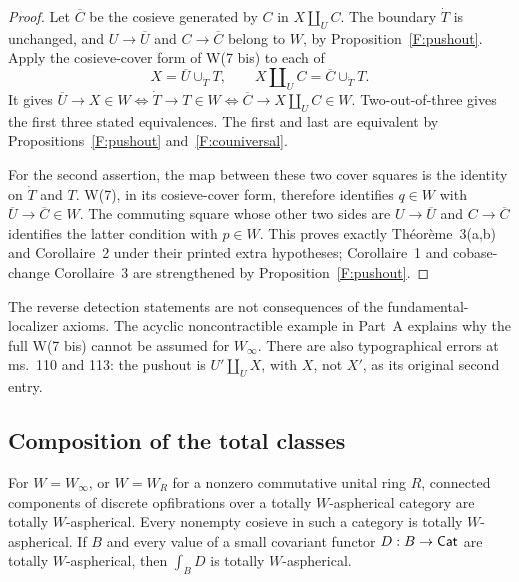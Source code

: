 \begin{proof}
Let $\overline C$ be the cosieve generated by $C$ in
$X\amalg_U C$. The boundary $\dot T$ is unchanged, and
$U\to\overline U$ and $C\to\overline C$ belong to $W$, by
Proposition~\ref{F:pushout}. Apply the cosieve-cover form of
W(7 bis) to each of
\[
 X=\overline U\cup_{\dot T}T,
 \qquad
 X\amalg_U C=\overline C\cup_{\dot T}T.
\]
It gives
$\overline U\to X\in W\Longleftrightarrow
\dot T\to T\in W\Longleftrightarrow
\overline C\to X\amalg_U C\in W$.
Two-out-of-three gives the first three stated equivalences.
The first and last are equivalent by
Propositions~\ref{F:pushout} and~\ref{F:couniversal}.

For the second assertion, the map between these two cover
squares is the identity on $\dot T$ and $T$. W(7), in its
cosieve-cover form, therefore identifies
$q\in W$ with $\overline U\to\overline C\in W$.
The commuting square whose other two sides are
$U\to\overline U$ and $C\to\overline C$ identifies the
latter condition with $p\in W$. This proves exactly
Th\'eor\`eme~3(a,b) and Corollaire~2 under their printed
extra hypotheses; Corollaire~1 and cobase-change
Corollaire~3 are strengthened by Proposition~\ref{F:pushout}.
\end{proof}

The reverse detection statements are not consequences of the
fundamental-localizer axioms. The acyclic noncontractible example
in Part~A explains why the full W(7 bis) cannot be assumed for
$W_\infty$. There are also typographical errors at
ms.~110 and 113: the pushout is $U'\amalg_U X$, with $X$, not $X'$,
as its original second entry.

\subsection{Composition of the total classes}

\begin{lemma}
\label{F:total-operations}
For $W=W_\infty$, or $W=W_R$ for a nonzero commutative unital ring
$R$, connected components of discrete opfibrations over
a totally $W$-aspherical category are totally $W$-aspherical. Every
nonempty cosieve in such a category is totally $W$-aspherical. If
$B$ and every value of a small covariant functor $D:B\to\mathsf{Cat}$ are
totally $W$-aspherical, then $\int_BD$ is totally $W$-aspherical.
\end{lemma}


